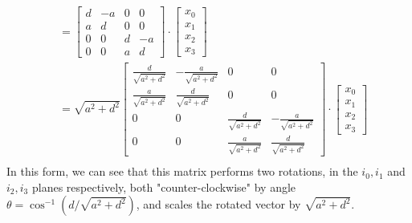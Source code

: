 \documentclass[11pt]{article}
\begin{document}
\begin{enumerate}
\begin{align*}
            &= \begin{bmatrix} d & -a & 0 & 0\\ a & d & 0 & 0 \\ 0 & 0 & d & -a \\ 0 & 0 & a & d \end{bmatrix} \cdot \begin{bmatrix} x_0 \\ x_1 \\ x_2 \\ x_3 \end{bmatrix}\\
            &=  \sqrt{a^2 + d^2}\begin{bmatrix} \frac{d}{\sqrt{a^2 + d^2}} & -\frac{a}{\sqrt{a^2 + d^2}} & 0 & 0\\ \frac{a}{\sqrt{a^2 + d^2}} & \frac{d}{\sqrt{a^2 + d^2}} & 0 & 0 \\ 0 & 0 & \frac{d}{\sqrt{a^2 + d^2}} & -\frac{a}{\sqrt{a^2 + d^2}} \\ 0 & 0 & \frac{a}{\sqrt{a^2 + d^2}} & \frac{d}{\sqrt{a^2 + d^2}} \end{bmatrix} \cdot \begin{bmatrix} x_0 \\ x_1 \\ x_2 \\ x_3 \end{bmatrix}\\
        \end{align*}
        In this form, we can see that this matrix performs two rotations, in the $i_0, i_1$ and $i_2, i_3$ planes respectively, both "counter-clockwise" by angle $\theta = \cos^{-1}(d / \sqrt{a^2 + d^2})$, and scales the rotated vector by $\sqrt{a^2 + d^2}$.


\end{enumerate}
\end{document}
